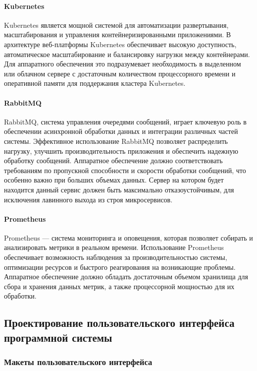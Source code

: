 \paragraph{Kubernetes}

Kubernetes является мощной системой для автоматизации развертывания, масштабирования и управления контейнеризированными приложениями. В архитектуре веб-платформы Kubernetes обеспечивает высокую доступность, автоматическое масштабирование и балансировку нагрузки между контейнерами. Для аппаратного обеспечения это подразумевает необходимость в выделенном или облачном сервере с достаточным количеством процессорного времени и оперативной памяти для поддержания кластера Kubernetes.

\paragraph{RabbitMQ}

RabbitMQ, система управления очередями сообщений, играет ключевую роль в обеспечении асинхронной обработки данных и интеграции различных частей системы. Эффективное использование RabbitMQ позволяет распределить нагрузку, улучшить производительность приложения и обеспечить надежную обработку сообщений. Аппаратное обеспечение должно соответствовать требованиям по пропускной способности и скорости обработки сообщений, что особенно важно при больших объемах данных. Сервер на котором будет находится данный сервис должен быть максимально отказоустойчивым, для исключения лавинного выхода из строя микросервисов.

\paragraph{Prometheus}

Prometheus — система мониторинга и оповещения, которая позволяет собирать и анализировать метрики в реальном времени. Использование Prometheus обеспечивает возможность наблюдения за производительностью системы, оптимизации ресурсов и быстрого реагирования на возникающие проблемы. Аппаратное обеспечение должно обладать достаточным объемом хранилища для сбора и хранения данных метрик, а также процессорной мощностью для их обработки.

\subsection{Проектирование пользовательского интерфейса программной системы}
\subsubsection{Макеты пользовательского интерфейса}

